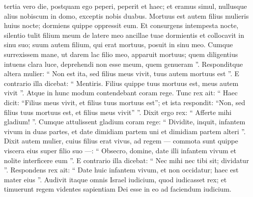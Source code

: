 \begin{biblechapter}
\begin{biblechapter}
\begin{biblechapter}
\verse tertia vero die, postquam ego peperi, peperit et haec; et eramus simul, nullusque alius nobiscum in domo, exceptis nobis duabus. 
\verse Mortuus est autem filius mulieris huius nocte; dormiens quippe oppressit eum. 
\verse Et consurgens intempesta nocte, silentio tulit filium meum de latere meo ancillae tuae dormientis et collocavit in sinu suo; suum autem filium, qui erat mortuus, posuit in sinu meo. 
\verse Cumque surrexissem mane, ut darem lac filio meo, apparuit mortuus; quem diligentius intuens clara luce, deprehendi non esse meum, quem genueram ”. 
\verse Responditque altera mulier: “ Non est ita, sed filius meus vivit, tuus autem mortuus est ”. E contrario illa dicebat: “ Mentiris. Filius quippe tuus mortuus est, meus autem vivit ”. Atque in hunc modum contendebant coram rege.
 \verse Tunc rex ait: “ Haec dicit: “Filius meus vivit, et filius tuus mortuus est”; et ista respondit: “Non, sed filius tuus mortuus est, et filius meus vivit” ”. 
 \verse Dixit ergo rex: “ Afferte mihi gladium! ”. Cumque attulissent gladium coram rege: 
\verse “ Dividite, inquit, infantem vivum in duas partes, et date dimidiam partem uni et dimidiam partem alteri ”. 
\verse Dixit autem mulier, cuius filius erat vivus, ad regem — commota sunt quippe viscera eius super filio suo —: “ Obsecro, domine, date illi infantem vivum et nolite interficere eum ”. E contrario illa dicebat: “ Nec mihi nec tibi sit; dividatur ”. 
\verse Respondens rex ait: “ Date huic infantem vivum, et non occidatur; haec est mater eius ”.
 \verse Audivit itaque omnis Israel iudicium, quod iudicasset rex; et timuerunt regem videntes sapientiam Dei esse in eo ad faciendum iudicium.
 

\end{biblechapter}
\end{biblechapter}
\end{biblechapter}
